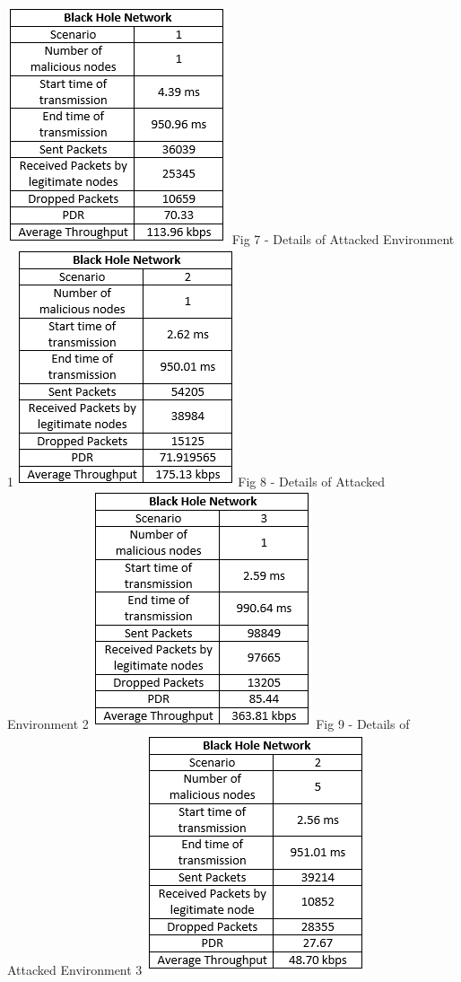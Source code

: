 \documentclass[conference,12pt]{IEEEtran}
\begin{document}
\begin{center}
\linebreak 
\includegraphics{BHScen1}
\linebreak 
Fig 7 - Details of Attacked Environment 1
\includegraphics{BHScen2}
\linebreak 
Fig 8 - Details of Attacked Environment 2
\includegraphics{BHScen3}
\linebreak 
Fig 9 - Details of Attacked Environment 3
\includegraphics{BH5Scen2}

\end{center}
\end{document}
